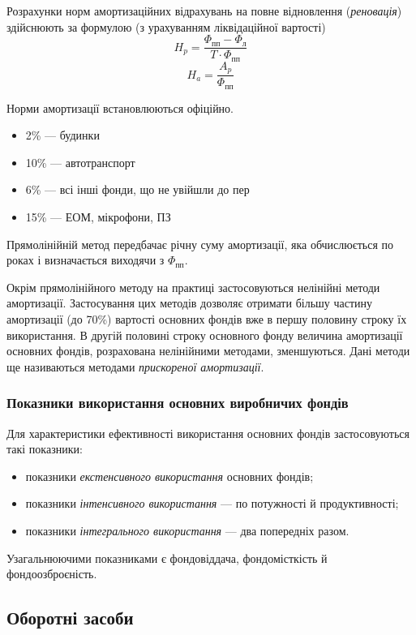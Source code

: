 \documentclass[a4paper,10pt,notitlepage,pdftex,headsepline]{scrartcl}
\begin{document}
      Розрахунки норм амортизаційних відрахувань на повне відновлення
      (\emph{реновація}) здійснюють за формулою (з урахуванням ліквідаційної
      вартості)
      \[
        H_p = \frac{\Phi_\text{пп} - \Phi_\text{л}}{T \cdot \Phi_\text{пп}}
        \]\[H_a = \frac{A_p}{\Phi_\text{пп}} \]

      Норми амортизації встановлюються офіційно.
      \begin{itemize}
        \item 2\% --- будинки
        \item 10\% --- автотранспорт
        \item 6\% --- всі інші фонди, що не увійшли до пер
        \item 15\% --- ЕОМ, мікрофони, ПЗ
      \end{itemize}

      Прямолінійній метод передбачає річну суму амортизації, яка обчислюється по
      роках і визначається виходячи з $ \Phi_\text{пп}$.

      Окрім прямолінійного методу на практиці застосовуються нелінійні методи
      амортизації.
      Застосування цих методів дозволяє отримати більшу частину амортизації (до
      70\%) вартості основних фондів вже в першу половину строку їх
      використання.
      В другій половині строку основного фонду величина амортизації основних
      фондів, розрахована нелінійними методами, зменшуються.
      Дані методи ще називаються методами \emph{прискореної амортизації}.

    \subsubsection{Показники використання основних виробничих фондів}
      Для характеристики ефективності використання основних фондів
      застосовуються такі показники:
      \begin{itemize}
        \item показники \emph{екстенсивного використання} основних фондів;
        \item показники \emph{інтенсивного використання} --- по потужності й
          продуктивності;
        \item показники \emph{інтегрального використання} --- два попередніх
          разом.
      \end{itemize}

      Узагальнюючими показниками є фондовіддача, фондомісткість й
      фондоозброєність.

  \subsection{Оборотні засоби}
\end{document}
